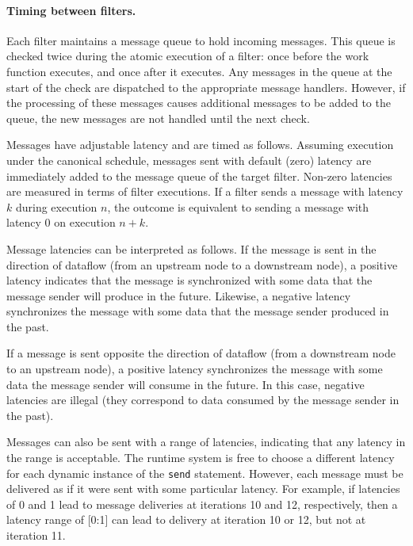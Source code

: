 \paragraph{Timing between filters.}  

Each filter maintains a message queue to hold incoming messages.  This
queue is checked twice during the atomic execution of a filter: once
before the work function executes, and once after it executes.  Any
messages in the queue at the start of the check are dispatched to the
appropriate message handlers.  However, if the processing of these
messages causes additional messages to be added to the queue, the new
messages are not handled until the next check.

Messages have adjustable latency and are timed as follows.  Assuming
execution under the canonical schedule, messages sent with default
(zero) latency are immediately added to the message queue of the
target filter.  Non-zero latencies are measured in terms of filter
executions.  If a filter sends a message with latency $k$ during
execution $n$, the outcome is equivalent to sending a message with
latency 0 on execution $n+k$.

Message latencies can be interpreted as follows.  If the message is
sent in the direction of dataflow (from an upstream node to a
downstream node), a positive latency indicates that the message is
synchronized with some data that the message sender will produce in
the future.  Likewise, a negative latency synchronizes the message
with some data that the message sender produced in the past.

If a message is sent opposite the direction of dataflow (from a
downstream node to an upstream node), a positive latency synchronizes
the message with some data the message sender will consume in the
future.  In this case, negative latencies are illegal (they correspond
to data consumed by the message sender in the past).

Messages can also be sent with a range of latencies, indicating that
any latency in the range is acceptable.  The runtime system is free to
choose a different latency for each dynamic instance of the
\lstinline|send| statement.  However, each message must be delivered 
as if it were sent with some particular latency.  For example, if
latencies of 0 and 1 lead to message deliveries at iterations 10 and
12, respectively, then a latency range of [0:1] can lead to delivery
at iteration 10 or 12, but not at iteration 11.

\medskip
{}

